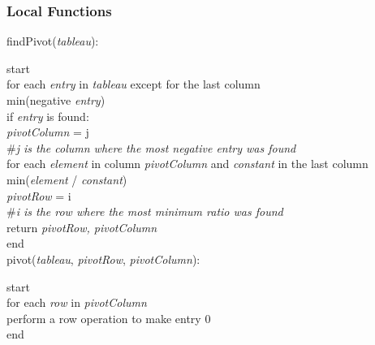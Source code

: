 \documentclass[12pt, titlepage]{article}
\begin{document}
\subsubsection{Local Functions}

\noindent 
findPivot(\textit{tableau}):

\hspace*{0.3cm} start \\
\hspace*{2cm} for each \textit{entry} in \textit{tableau} except for the last 
column \\
\hspace*{3cm} min(negative \textit{entry}) \\
\hspace*{3cm} if \textit{entry} is found: \\
\hspace*{4cm} \textit{pivotColumn} = j \\
\hspace*{4cm} \textcolor{pyComment}{\#\textit{j is the column where the most 
negative entry was found}} \\
\hspace*{2cm} for each \textit{element} in column \textit{pivotColumn} and 
\textit{constant} in the last column\\
\hspace*{3cm} min(\textit{element} / \textit{constant}) \\
\hspace*{3cm} \textit{pivotRow} = i \\
\hspace*{3cm} \textcolor{pyComment}{\#\textit{i is the row where the most 
minimum ratio was found}} \\
\hspace*{2cm} return \textit{pivotRow, pivotColumn} \\
\hspace*{0.9cm} end \\

\noindent 
pivot(\textit{tableau}, \textit{pivotRow}, \textit{pivotColumn}):

\hspace*{0.3cm} start \\
\hspace*{2cm} for each \textit{row} in \textit{pivotColumn} \\
\hspace*{3cm} perform a row operation to make entry 0 \\
\hspace*{0.9cm} end \\
\end{document}
